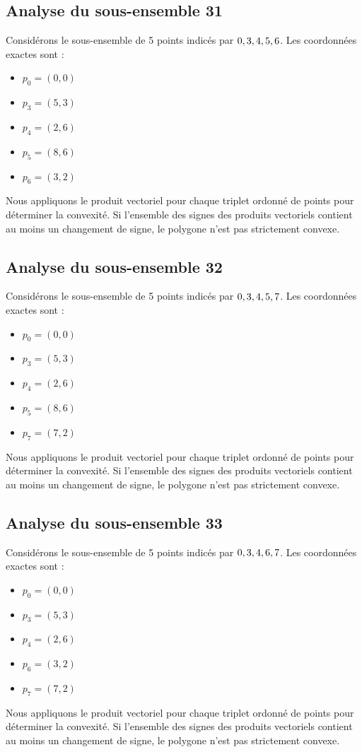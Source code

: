 \documentclass[11pt]{article}
\begin{document}
\subsection{Analyse du sous-ensemble 31}
Considérons le sous-ensemble de 5 points indicés par $\\{ 0, 3, 4, 5, 6 \\}$.
Les coordonnées exactes sont :
\begin{itemize}
\item $p_0 = (0, 0)$
\item $p_3 = (5, 3)$
\item $p_4 = (2, 6)$
\item $p_5 = (8, 6)$
\item $p_6 = (3, 2)$
\end{itemize}
Nous appliquons le produit vectoriel pour chaque triplet ordonné de points pour déterminer la convexité. Si l'ensemble des signes des produits vectoriels contient au moins un changement de signe, le polygone n'est pas strictement convexe.
\newpage

\subsection{Analyse du sous-ensemble 32}
Considérons le sous-ensemble de 5 points indicés par $\\{ 0, 3, 4, 5, 7 \\}$.
Les coordonnées exactes sont :
\begin{itemize}
\item $p_0 = (0, 0)$
\item $p_3 = (5, 3)$
\item $p_4 = (2, 6)$
\item $p_5 = (8, 6)$
\item $p_7 = (7, 2)$
\end{itemize}
Nous appliquons le produit vectoriel pour chaque triplet ordonné de points pour déterminer la convexité. Si l'ensemble des signes des produits vectoriels contient au moins un changement de signe, le polygone n'est pas strictement convexe.
\newpage

\subsection{Analyse du sous-ensemble 33}
Considérons le sous-ensemble de 5 points indicés par $\\{ 0, 3, 4, 6, 7 \\}$.
Les coordonnées exactes sont :
\begin{itemize}
\item $p_0 = (0, 0)$
\item $p_3 = (5, 3)$
\item $p_4 = (2, 6)$
\item $p_6 = (3, 2)$
\item $p_7 = (7, 2)$
\end{itemize}
Nous appliquons le produit vectoriel pour chaque triplet ordonné de points pour déterminer la convexité. Si l'ensemble des signes des produits vectoriels contient au moins un changement de signe, le polygone n'est pas strictement convexe.
\newpage
\end{document}
